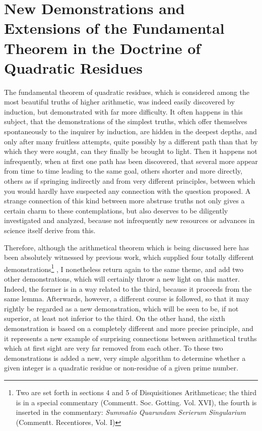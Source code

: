 \documentclass{book}
\theoremstyle{plain}
\theoremstyle{remark}
\begin{document}
\section*{New Demonstrations and Extensions of the Fundamental Theorem in the Doctrine of Quadratic Residues}

The fundamental theorem of quadratic residues, which is considered among the most beautiful truths of higher arithmetic, was indeed easily discovered by induction, but demonstrated with far more difficulty.  It often happens in this subject, that the demonstrations of the simplest truths, which offer themselves spontaneously to the inquirer by induction, are hidden in the deepest depths, and only after many fruitless attempts, quite possibly by a different path than that by which they were sought, can they finally be brought to light.  Then it happens not infrequently, when at first one path has been discovered, that several more appear from time to time leading to the same goal, others shorter and more directly, others as if springing indirectly and from very different principles, between which you would hardly have suspected any connection with the question proposed.  A strange connection of this kind between more abstruse truths not only gives a certain charm to these contemplations, but also deserves to be diligently investigated and analyzed, because not infrequently new resources or advances in science itself derive from this.

Therefore, although the arithmetical theorem which is being discussed here has been absolutely witnessed by previous work, which supplied four totally different demonstrations\footnote{Two are set forth in sections 4 and 5 of Disquisitiones Arithmeticae; the third is in a special commentary (Commentt. Soc. Gotting. Vol. XVI), the fourth is inserted in the commentary: \textit{Summatio Quarundam Serierum Singularium} (Commentt. Recentiores, Vol. I)} , I nonetheless return again to the same theme, and add two other demonstrations, which will certainly throw a new light on this matter.  Indeed, the former is in a way related to the third, because it proceeds from the same lemma.  Afterwards, however, a different course is followed, so that it may rightly be regarded as a new demonstration, which will be seen to be, if not superior, at least not inferior to the third.  On the other hand, the sixth demonstration is based on a completely different and more precise principle, and it represents a new example of surprising connections between arithmetical truths which at first sight are very far removed from each other.  To these two demonstrations is added a new, very simple algorithm to determine whether a given integer is a quadratic residue or non-residue of a given prime number.
\end{document}
